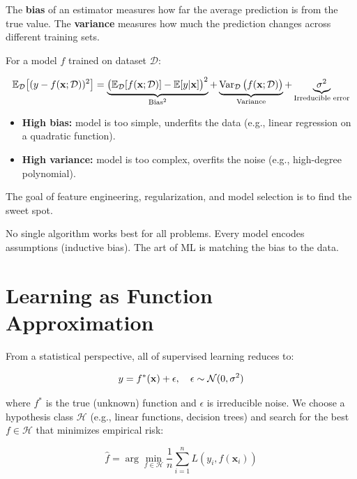 \begin{definition}
	The \textbf{bias} of an estimator measures how far the average prediction is from the true value. The \textbf{variance} measures how much the prediction changes across different training sets.
\end{definition}

For a model $f$ trained on dataset $\mathcal{D}$:

\[
	\mathbb{E}_{\mathcal{D}}\big[(y - f(\mathbf{x}; \mathcal{D}))^2\big] = \underbrace{\big(\mathbb{E}_{\mathcal{D}}[f(\mathbf{x}; \mathcal{D})] - \mathbb{E}[y|\mathbf{x}]\big)^2}_{\text{Bias}^2} + \underbrace{\operatorname{Var}_{\mathcal{D}}\big(f(\mathbf{x}; \mathcal{D})\big)}_{\text{Variance}} + \underbrace{\sigma^2}_{\text{Irreducible error}}
\]

\begin{itemize}
	\item \textbf{High bias:} model is too simple, underfits the data (e.g., linear regression on a quadratic function).
	\item \textbf{High variance:} model is too complex, overfits the noise (e.g., high-degree polynomial).
\end{itemize}

The goal of feature engineering, regularization, and model selection is to find the sweet spot.

\begin{principle}
	No single algorithm works best for all problems. Every model encodes assumptions (inductive bias). The art of ML is matching the bias to the data.
\end{principle}

\section{Learning as Function Approximation}

From a statistical perspective, all of supervised learning reduces to:

\[
	y = f^*(\mathbf{x}) + \epsilon, \quad \epsilon \sim \mathcal{N}(0, \sigma^2)
\]

where $f^*$ is the true (unknown) function and $\epsilon$ is irreducible noise. We choose a hypothesis class $\mathcal{H}$ (e.g., linear functions, decision trees) and search for the best $f \in \mathcal{H}$ that minimizes empirical risk:

\[
	\hat{f} = \arg\min_{f \in \mathcal{H}} \frac{1}{n} \sum_{i=1}^n L(y_i, f(\mathbf{x}_i))
\]

